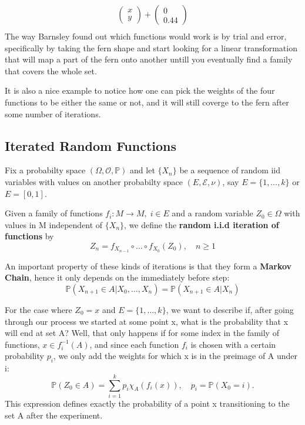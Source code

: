 \documentclass[../stationary_ifs.tex]{subfiles}
\begin{document}
\begin{example}
\begin{align*}
\begin{pmatrix}
			                         x \\
			                         y
		                         \end{pmatrix} + \begin{pmatrix}
			                                         0 \\
			                                         0.44
		                                         \end{pmatrix} \\
	\end{align*}
	The way Barnsley found out which functions would work is by trial and error, specifically by taking the fern shape and start looking for a linear transformation that will map a part of the fern
	onto another untill you eventually find a family that covers the whole set.

	It is also a nice example to notice how one can pick the weights of the four functions to be either the same or not, and it will still coverge to the fern after some number of iterations.
\end{example}

\subsection{Iterated Random Functions}

Fix a probabilty space \((\Omega , \mathcal{O}, \mathbb{P})\) and let \(\{X_{n}\}\) be a sequence of random iid variables with values on another probabilty space \((E, \mathcal{E}, \nu)\), say
\(E = \{1, \dotsc , k\}\) or \(E = [0, 1]\).

\begin{def*}
	Given a family of functions \(f_{i}:M\rightarrow M,\; i\in E\) and a random variable \(Z_{0}\in \Omega \) with values in M independent of \(\{X_{n}\}\), we define the \textbf{random i.i.d iteration of functions} by
	\[
		Z_{n} = f_{X_{n-1}}\circ \dotsc \circ f_{X_{0}}(Z_{0}), \quad n\geq 1
	\]
\end{def*}
An important property of these kinds of iterations is that they form a \textbf{Markov Chain}, hence it only depends on the immediately before step:
\[
	\mathbb{P}(X_{n+1}\in A| X_{0}, \dotsc , X_{n}) = \mathbb{P}(X_{n+1}\in A| X_{n})
\]

For the case where \(Z_{0} = x\) and \(E = \{1, \dotsc , k\}\), we want to describe if, after going through our process we started at some point x, what is the probability that x will end at set A? Well, that only happens if for some index in the family of functions,
\(x\in f_{i}^{-1}(A)\), and since each function \(f_{i}\) is chosen with a certain probability \(p_{i}\), we only add the weights for which x is in the preimage of A under i:
\[
	\mathbb{P}(Z_{0}\in A) = \sum\limits_{i=1}^{k}p_{i}\chi_{A}(f_{i}(x)), \quad p_{i} = \mathbb{P}(X_{0} = i).
\]
This expression defines exactly the probability of a point x transitioning to the set A after the experiment.
\end{document}
